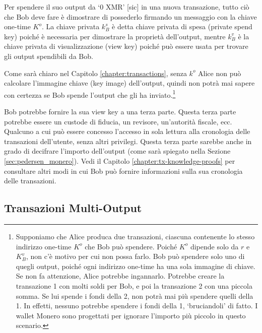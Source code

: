 Per spendere il suo output da `0 XMR' [sic] in una nuova transazione, tutto ciò che Bob deve fare è dimostrare di possederlo firmando un messaggio con la chiave one-time $K^o$. La chiave privata $k_B^s$ è detta chiave privata di spesa (private spend key) poiché è necessaria per dimostrare la proprietà dell’output, mentre $k_B^v$ è la chiave privata di visualizzazione (view key) poiché può essere usata per trovare gli output spendibili da Bob.

Come sarà chiaro nel Capitolo \ref{chapter:transactions}, senza $k^o$ Alice non può calcolare l’immagine chiave (key image) dell’output, quindi non potrà mai sapere con certezza se Bob spende l’output che gli ha inviato.\footnote{Supponiamo che Alice produca due transazioni, ciascuna contenente lo stesso indirizzo one-time $K^o$ che Bob può spendere. Poiché $K^o$ dipende solo da $r$ e $K_B^v$, non c’è motivo per cui non possa farlo. Bob può spendere solo uno di quegli output, poiché ogni indirizzo one-time ha una sola immagine di chiave. Se non fa attenzione, Alice potrebbe ingannarlo. Potrebbe creare la transazione 1 con molti soldi per Bob, e poi la transazione 2 con una piccola somma. Se lui spende i fondi della 2, non potrà mai più spendere quelli della 1. In effetti, nessuno potrebbe spendere i fondi della 1, `bruciandoli' di fatto. I wallet Monero sono progettati per ignorare l'importo più piccolo in questo scenario.}

Bob potrebbe fornire la sua view key a una terza parte. Questa terza parte potrebbe essere un custode di fiducia, un revisore, un’autorità fiscale, ecc. Qualcuno a cui può essere concesso l’accesso in sola lettura alla cronologia delle transazioni dell’utente, senza altri privilegi. Questa terza parte sarebbe anche in grado di decifrare l’importo dell’output (come sarà spiegato nella Sezione \ref{sec:pedersen_monero}). Vedi il Capitolo \ref{chapter:tx-knowledge-proofs} per consultare altri modi in cui Bob può fornire informazioni sulla sua cronologia delle transazioni.


\subsection{Transazioni Multi-Output}
\label{sec:multi_out_transactions}

